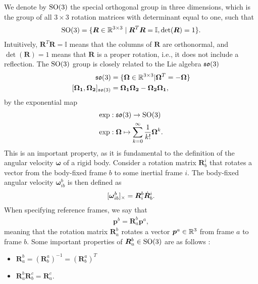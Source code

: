 We denote by $\operatorname{SO}(3)$ the special orthogonal group in three dimensions, which is
the group of all $3 \times 3$ rotation matrices with determinant equal to one,
such that
\begin{align}
    \operatorname{SO}(3) = \{ \bm{R} \in \mathbb{R}^{3 \times 3} \mid \bm{R}^T \bm{R} = \mathbb{I}, \det(\bm{R}) = 1 \}.
\end{align}
Intuitively, $\bm{R}^T \bm{R} = \mathbb{I}$ means that the columns of $\bm{R}$ are orthonormal,
and $\det(\bm{R}) = 1$ means that $\bm{R}$ is a proper rotation, i.e., it does not include
a reflection. The $\operatorname{SO}(3)$ group is closely related to the Lie algebra $\mathfrak{so}(3)$
\begin{subequations}
\begin{align}
    \mathfrak{so}(3) &= \{ \bm{\Omega} \in \mathbb{R}^{3 \times 3} | \bm{\Omega}^T = -\bm{\Omega} \} \\
    [\bm{\Omega_1}, \bm{\Omega_2}]_{\mathfrak{so}(3)} &= \bm{\Omega_1} \bm{\Omega_2}
        - \bm{\Omega_2} \bm{\Omega_1},
\end{align}
\end{subequations}
by the exponential map
\begin{subequations}
\begin{align}
    \exp &: \mathfrak{so}(3) \to \operatorname{SO}(3) \\
    \exp &: \bm{\Omega} \mapsto \sum_{k=0}^{\infty} \frac{1}{k!} \bm{\Omega}^k.
\end{align}
\end{subequations}
This is an important property, as it is fundamental to the definition of the
angular velocity $\bm{\omega}$ of a rigid body. Consider a rotation matrix
$\bm{R}_b^i$ that rotates a vector from the body-fixed frame $b$ to some inertial
frame $i$. The body-fixed angular velocity $\bm{\omega}_{ib}^b$ is then defined
as
\begin{align}
    [ \bm{\omega}_{ib}^b ]_{\times} = \bm{R}_i^b \dot{\bm{R}}_b^i.
\end{align}
When specifying reference frames, we say that
\begin{align}
    \bm{p}^b = \bm{R}_{a}^b \bm{p}^a,
\end{align}
meaning that the rotation matrix $\bm{R}_{a}^b$ rotates a vector
$\bm{p}^a\in\mathbb{R}^3$ from frame $a$ to frame $b$. Some important properties
of $\bm{R}_a^b \in \operatorname{SO}(3)$ are as follows \cite{modsim}:
\begin{itemize}
\item $\bm{R}_a^b = (\bm{R}_b^a)^{-1} = (\bm{R}_b^a)^T$
\item $\bm{R}_a^b \bm{R}_b^c = \bm{R}_a^c$.
\end{itemize}

